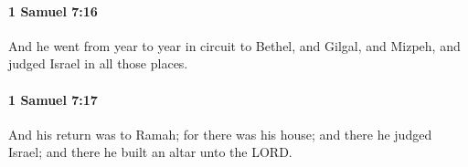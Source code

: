 		\paragraph{1 Samuel 7:16} %
			\label{1SAMUEL-7-16}

			And he went from year to year in circuit to Bethel, and Gilgal, and Mizpeh, and judged Israel in all those places.


		\paragraph{1 Samuel 7:17} %
			\label{1SAMUEL-7-17}

			And his return was to Ramah; for there was his house; and there he judged Israel; and there he built an altar unto the LORD.

